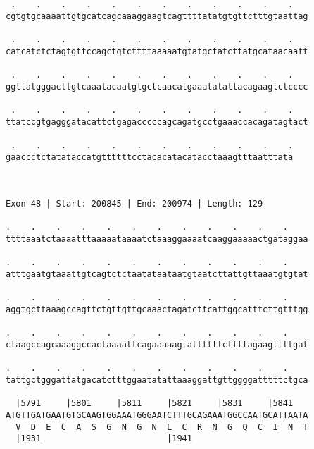 \documentclass{article}
\begin{document}
\begin{Verbatim}
 .    .    .    .    .    .    .    .    .    .    .    .   
cgtgtgcaaaattgtgcatcagcaaaggaagtcagttttatatgtgttctttgtaattag
                                                            
 .    .    .    .    .    .    .    .    .    .    .    .   
catcatctctagtgttccagctgtcttttaaaaatgtatgctatcttatgcataacaatt
                                                            
 .    .    .    .    .    .    .    .    .    .    .    .   
ggttatgggacttgtcaaatacaatgtgctcaacatgaaatatattacagaagtctcccc
                                                            
 .    .    .    .    .    .    .    .    .    .    .    .   
ttatccgtgagggatacattctgagacccccagcagatgcctgaaaccacagatagtact
                                                            
 .    .    .    .    .    .    .    .    .    .    .    .
gaaccctctatataccatgttttttcctacacatacatacctaaagtttaatttata
                                                         
                                                         
 
Exon 48 | Start: 200845 | End: 200974 | Length: 129
 
.    .    .    .    .    .    .    .    .    .    .    .    
ttttaaatctaaaatttaaaaataaaatctaaaggaaaatcaaggaaaaactgataggaa
                                                            
.    .    .    .    .    .    .    .    .    .    .    .    
atttgaatgtaaattgtcagtctctaatataataatgtaatcttattgttaaatgtgtat
                                                            
.    .    .    .    .    .    .    .    .    .    .    .    
aggtgcttaaagccagttctgttgttgcaaactagatcttcattggcatttcttgtttgg
                                                            
.    .    .    .    .    .    .    .    .    .    .    .    
ctaagccagcaaaggccactaaaattcagaaaaagtattttttcttttagaagttttgat
                                                            
.    .    .    .    .    .    .    .    .    .    .    .    
tattgctgggattatgacatctttggaatatattaaaggattgttggggatttttctgca
                                                            
  |5791     |5801     |5811     |5821     |5831     |5841   
ATGTTGATGAATGTGCAAGTGGAAATGGGAATCTTTGCAGAAATGGCCAATGCATTAATA
  V  D  E  C  A  S  G  N  G  N  L  C  R  N  G  Q  C  I  N  T
  |1931                         |1941                       
  

\end{Verbatim}
\end{document}
